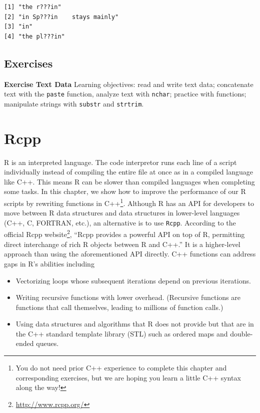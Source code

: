 \documentclass[
]{krantz}
\providecommand{\tightlist}{%
  \setlength{\itemsep}{0pt}\setlength{\parskip}{0pt}}
\renewcommand{\href}[2]{#2\footnote{\url{#1}}}
\begin{document}
\begin{verbatim}
[1] "the r???in"                
[2] "in Sp???in    stays mainly"
[3] "in"                        
[4] "the pl???in"               
\end{verbatim}

\hypertarget{exercises-8}{%
\section{Exercises}\label{exercises-8}}

\textbf{Exercise Text Data} Learning objectives: read and write text data; concatenate text with the \texttt{paste} function, analyze text with \texttt{nchar}; practice with functions; manipulate strings with \texttt{substr} and \texttt{strtrim}.

\hypertarget{rcpp}{%
\chapter{Rcpp}\label{rcpp}}

R is an interpreted language. The code interpretor runs each line of a script individually instead of compiling the entire file at once as in a compiled language like C++. This means R can be slower than compiled languages when completing some tasks. In this chapter, we show how to improve the performance of our R scripts by rewriting functions in C++\footnote{You do not need prior C++ experience to complete this chapter and corresponding exercises, but we are hoping you learn a little C++ syntax along the way!}. Although R has an API for developers to move between R data structures and data structures in lower-level languages (C++, C, FORTRAN, etc.), an alternative is to use \texttt{Rcpp}. According to the \href{http://www.rcpp.org/}{official Rcpp website}, ``Rcpp provides a powerful API on top of R, permitting direct interchange of rich R objects between R and C++.'' It is a higher-level approach than using the aforementioned API directly. C++ functions can address gaps in R's abilities including

\begin{itemize}
\tightlist
\item
  Vectorizing loops whose subsequent iterations depend on previous iterations.
\item
  Writing recursive functions with lower overhead. (Recursive functions are functions that call themselves, leading to millions of function calls.)
\item
  Using data structures and algorithms that R does not provide but that are in the C++ standard template library (STL) such as ordered maps and double-ended queues.
\end{itemize}
\end{document}
